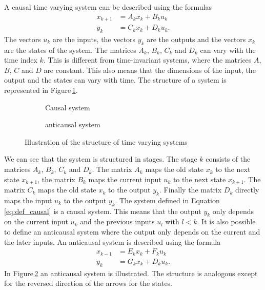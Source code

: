 \documentclass[doctype=mastersthesis,BCOR=15mm,biblatex]{ldvbook}%
\begin{document}
A causal time varying system can be described using the formulas
\begin{subequations}
	\begin{align}
	x_{k+1} &= A_k x_k + B_k u_k \\
	y_k &= C_k x_k + D_k u_k 
	.
	\end{align}
	\label{eq:def_causal}
\end{subequations}
The vectors $u_k$ are the inputs, the vectors $y_k$ are the outputs and the vectors $x_k$ are the states of the system.
The matrices $A_k$, $B_k$, $C_k$ and $D_k$ can vary with the time index $k$.
This is different from time-invariant systems, where the matrices $A$, $B$, $C$ and $D$ are constant.
This also means that the dimensions of the input, the output and the states can vary with time.
The structure of a system is represented in Figure\,\ref{fig:struktur-system_a}.
\begin{figure}[htb]
	\centering
	\begin{subfigure}[b]{0.45\textwidth}
		\centering
		
		\caption{Causal system}
		\label{fig:struktur-system_a}
	\end{subfigure}
	\hspace{0.8cm}
	\begin{subfigure}[b]{0.45\textwidth}
		\centering
		
		\caption{anticausal system}
		\label{fig:struktur-system_b}
	\end{subfigure}
	\caption{Illustration of the structure of time varying systems}
	\label{fig:struktur-system}
\end{figure}
We can see that the system is structured in stages.
The stage $k$ consists of the matrices $A_k$, $B_k$, $C_k$ and $D_k$.
The matrix $A_k$ maps the old state $x_k$ to the next state $x_{k+1}$, the matrix $B_k$ maps the current input $u_k$ to the next state $x_{k+1}$.
The matrix $C_k$ maps the old state $x_k$ to the output $y_k$.
Finally the matrix $D_k$ directly maps the input $u_k$ to the output $y_k$.
The system defined in Equation\,\ref{eq:def_causal} is a causal system.
This means that the output $y_k$ only depends on the current input $u_k$ and the previous inputs $u_l$ with $l < k$.
It is also possible to define an anticausal system where the output only depends on the current and the later inputs.
An anticausal system is described using the formula
\begin{subequations}
	\begin{align}
	x_{k-1} &= E_k x_k + F_k u_k \\
	y_k &= G_k x_k + D_k u_k 
	.
	\end{align}
	\label{eq:def_anticausal}
\end{subequations}
In Figure\,\ref{fig:struktur-system_b} an anticausal system is illustrated.
The structure is analogous except for the reversed direction of the arrows for the states.
\end{document}
